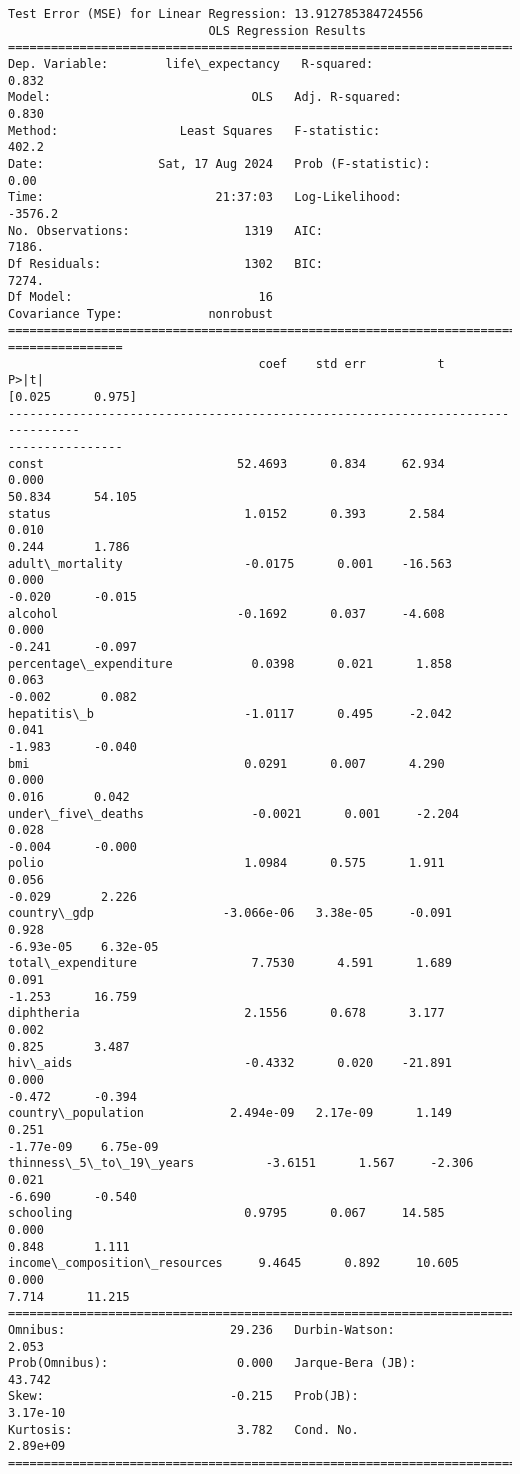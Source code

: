 \documentclass[11pt]{article}
\begin{document}
    \begin{Verbatim}[commandchars=\\\{\}]
Test Error (MSE) for Linear Regression: 13.912785384724556
                            OLS Regression Results
==============================================================================
Dep. Variable:        life\_expectancy   R-squared:                       0.832
Model:                            OLS   Adj. R-squared:                  0.830
Method:                 Least Squares   F-statistic:                     402.2
Date:                Sat, 17 Aug 2024   Prob (F-statistic):               0.00
Time:                        21:37:03   Log-Likelihood:                -3576.2
No. Observations:                1319   AIC:                             7186.
Df Residuals:                    1302   BIC:                             7274.
Df Model:                          16
Covariance Type:            nonrobust
================================================================================
================
                                   coef    std err          t      P>|t|
[0.025      0.975]
--------------------------------------------------------------------------------
----------------
const                           52.4693      0.834     62.934      0.000
50.834      54.105
status                           1.0152      0.393      2.584      0.010
0.244       1.786
adult\_mortality                 -0.0175      0.001    -16.563      0.000
-0.020      -0.015
alcohol                         -0.1692      0.037     -4.608      0.000
-0.241      -0.097
percentage\_expenditure           0.0398      0.021      1.858      0.063
-0.002       0.082
hepatitis\_b                     -1.0117      0.495     -2.042      0.041
-1.983      -0.040
bmi                              0.0291      0.007      4.290      0.000
0.016       0.042
under\_five\_deaths               -0.0021      0.001     -2.204      0.028
-0.004      -0.000
polio                            1.0984      0.575      1.911      0.056
-0.029       2.226
country\_gdp                  -3.066e-06   3.38e-05     -0.091      0.928
-6.93e-05    6.32e-05
total\_expenditure                7.7530      4.591      1.689      0.091
-1.253      16.759
diphtheria                       2.1556      0.678      3.177      0.002
0.825       3.487
hiv\_aids                        -0.4332      0.020    -21.891      0.000
-0.472      -0.394
country\_population            2.494e-09   2.17e-09      1.149      0.251
-1.77e-09    6.75e-09
thinness\_5\_to\_19\_years          -3.6151      1.567     -2.306      0.021
-6.690      -0.540
schooling                        0.9795      0.067     14.585      0.000
0.848       1.111
income\_composition\_resources     9.4645      0.892     10.605      0.000
7.714      11.215
==============================================================================
Omnibus:                       29.236   Durbin-Watson:                   2.053
Prob(Omnibus):                  0.000   Jarque-Bera (JB):               43.742
Skew:                          -0.215   Prob(JB):                     3.17e-10
Kurtosis:                       3.782   Cond. No.                     2.89e+09
==============================================================================


\end{Verbatim}
\end{document}
